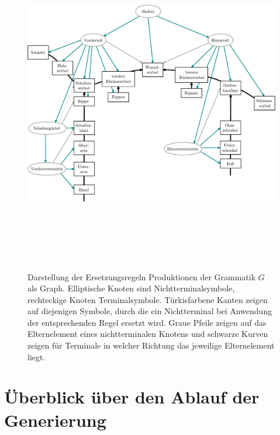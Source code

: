  
 \begin{figure}
  \centering
  \includegraphics[height=15cm, angle=90, origin=c]{graphics/grammarGraph}
  \caption{Darstellung der Ersetzungsregeln \bzw Produktionen der Grammatik $G$ als Graph. Elliptische Knoten sind Nichtterminalsymbole, rechteckige Knoten Terminalsymbole. Türkisfarbene Kanten zeigen auf diejenigen Symbole, durch die ein Nichtterminal bei Anwendung der entsprechenden Regel ersetzt wird. Graue Pfeile zeigen auf das Elternelement eines nichtterminalen Knotens und schwarze Kurven zeigen für Terminale in welcher Richtung das jeweilige Elternelement liegt.}
  \label{grammar_graph}
 \end{figure}


\section{Überblick über den Ablauf der Generierung}
\label{section:overview}

